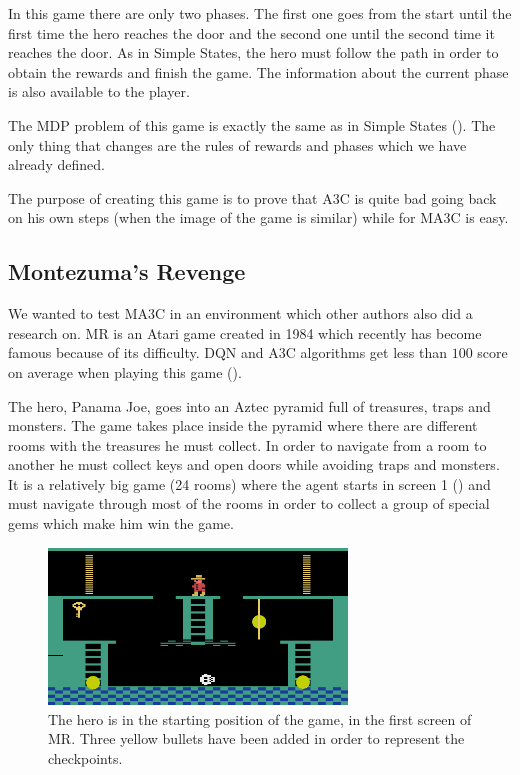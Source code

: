In this game there are only two phases.
The first one goes from the start until the first time the hero reaches the door and
the second one until the second time it reaches the door.
As in Simple States, the hero must follow the path in order to obtain the rewards and finish the game.
The information about the current phase is also available to the player.

The \ac{MDP} problem of this game is exactly the same as in Simple States ().
The only thing that changes are the rules of rewards and phases which we have already defined.

The purpose of creating this game is to prove that \ac{A3C} is quite bad going back on his own steps (when the image of the
game is similar) while for \ac{MA3C} is easy.

\subsection{Montezuma's Revenge\label{subsec:MontezumasRevenge}}

We wanted to test \ac{MA3C} in an environment which other authors also did a research on.
\acf{MR} is an Atari game created in 1984 which recently has become famous because of its difficulty.
\ac{DQN} and \ac{A3C} algorithms get less than $100$ score on average when playing this game (\cite{mnih2016A3C}).

The hero, Panama Joe, goes into an Aztec pyramid full of treasures, traps and monsters.
The game takes place inside the pyramid where there are different rooms with the treasures he must collect.
In order to navigate from a room to another he must collect keys and open doors while avoiding traps and monsters.
It is a relatively big game (24 rooms) where the agent starts in screen 1 () and must navigate
through most of the rooms in order to collect a group of special gems which make him win the game.

\begin{figure}[hbtp]
\begin{center}
\includegraphics[width=300]{img/montezuma_checkpoints.png}
\end{center}
\caption[Montezuma's Revenge game]
{The hero is in the starting position of the game, in the first screen of \acl{MR}.
Three yellow bullets have been added in order to represent the checkpoints.}
\label{fig:MontezumasRevenge}
\end{figure}

